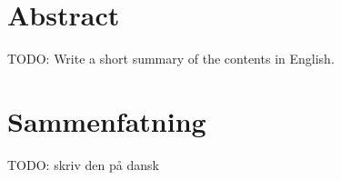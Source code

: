 \begingroup
\let\clearpage\relax
\let\cleardoublepage\relax
\let\cleardoublepage\relax

\chapter*{Abstract}
TODO: Write a short summary of the contents in English.


\vfill

\chapter*{Sammenfatning}
TODO: skriv den på dansk


\endgroup			

\vfill